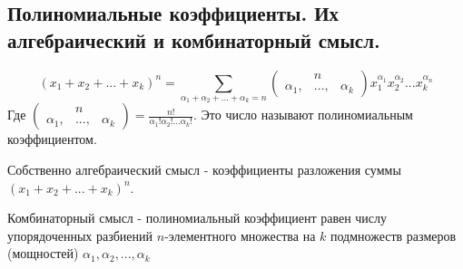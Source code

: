 \subsection{Полиномиальные коэффициенты. Их алгебраический и комбинаторный смысл.}
$$(x_1 + x_2 + ... + x_k)^n = \sum_{\alpha_1+\alpha_2+...+\alpha_k=n}\begin{pmatrix}&n\\\alpha_1,&...,&\alpha_k\end{pmatrix}x_1^{\alpha_1}x_2^{\alpha_2}...x_k^{\alpha_n}$$
Где $\begin{pmatrix}&n\\\alpha_1,&...,&\alpha_k\end{pmatrix} = \frac{n!}{\alpha_1!\alpha_2!...\alpha_k!}$. Это число называют полиномиальным коэффициентом. 

Собственно алгебраический смысл - коэффициенты разложения суммы $(x_1 + x_2 + ... + x_k)^n$.

Комбинаторный смысл - полиномиальный коэффициент равен числу упорядоченных разбиений $n$-элементного множества на $k$ подмножеств размеров (мощностей) $\alpha_1, \alpha_2,...,\alpha_k$